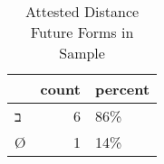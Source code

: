 \begin{table}[htbp!]
\centering
\caption{Attested Distance Future Forms in Sample}
\label{table:distfut_front}
\begin{tabular}{lrl}
\toprule
{} &  count & percent \\
\midrule
\texthebrew{ב} &      6 &     86\% \\
\texthebrew{Ø} &      1 &     14\% \\
\bottomrule
\end{tabular}
\end{table}
